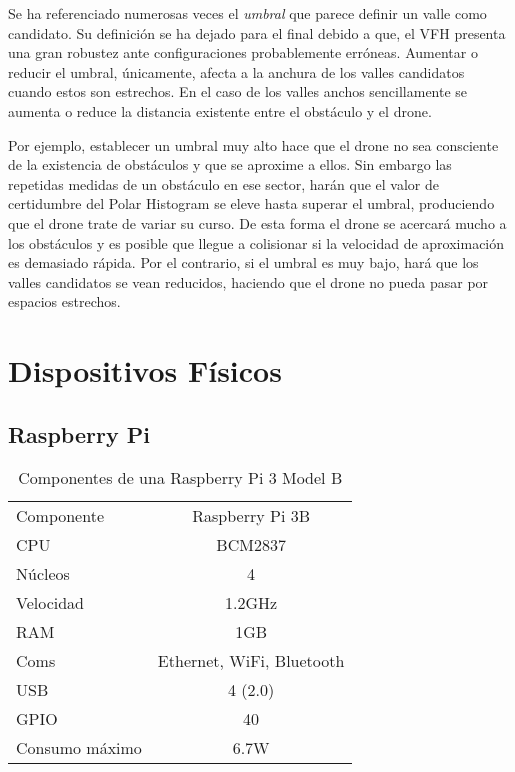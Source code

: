 Se ha referenciado numerosas veces el \textit{umbral} que parece definir un valle como candidato. Su definición se ha dejado para el final debido a que, el VFH presenta una gran robustez ante configuraciones probablemente erróneas. Aumentar o reducir el umbral, únicamente, afecta a la anchura de los valles candidatos cuando estos son estrechos. En el caso de los valles anchos sencillamente se aumenta o reduce la distancia existente entre el obstáculo y el drone.

Por ejemplo, establecer un umbral muy alto hace que el drone no sea consciente de la existencia de obstáculos y que se aproxime a ellos. Sin embargo las repetidas medidas de un obstáculo en ese sector, harán que el valor de certidumbre del Polar Histogram se eleve hasta superar el umbral, produciendo que el drone trate de variar su curso. De esta forma el drone se acercará mucho a los obstáculos y es posible que llegue a colisionar si la velocidad de aproximación es demasiado rápida. 
Por el contrario, si el umbral es muy bajo, hará que los valles candidatos se vean reducidos, haciendo que el drone no pueda pasar por espacios estrechos.


\section{Dispositivos Físicos}

\subsection{Raspberry Pi}

\begin{table}[H]
	\begin{center}
		\begin{tabular}{l | c}\hline
			\toprule
			Componente & Raspberry Pi 3B\\
			\otoprule
			CPU & BCM2837\\
			Núcleos & 4\\
			Velocidad & 1.2GHz\\
			RAM & 1GB\\
			Coms & Ethernet, WiFi, Bluetooth\\
			USB & 4 (2.0)\\
			GPIO & 40\\
			Consumo máximo & 6.7W\\
			\bottomrule
		\end{tabular}
		\caption{Componentes de una Raspberry Pi 3 Model B}
		\label{tb:raspi3hardware}
	\end{center}
\end{table}

